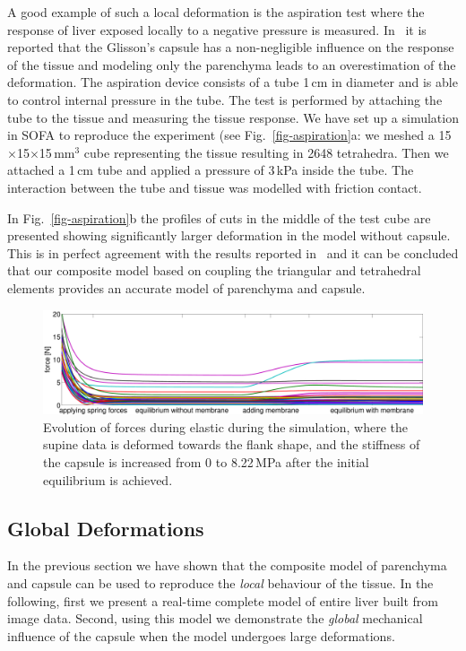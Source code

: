 \documentclass{llncs}
\begin{document}
A good example of such a local deformation is the aspiration test
where the response of liver exposed locally to a negative pressure is measured.
In~\cite{Hollenstein2006} it is reported that the Glisson's
capsule has a non-negligible influence on the response of the tissue and modeling
only the parenchyma leads to an overestimation of the deformation. 
The aspiration device consists of a tube 1\,cm in diameter and is able
to control internal pressure in the tube. The test is performed by
attaching the tube to the tissue and measuring the tissue response. We
have set up a simulation in SOFA to reproduce the experiment (see Fig.~\ref{fig-aspiration}a: we meshed a 15$\times$15$\times$15\,mm$^3$ 
cube representing the tissue 
resulting in 2648 tetrahedra. Then we attached a 1\,cm tube 
and applied a pressure of 3\,kPa inside the tube. The interaction between the tube and 
tissue was modelled with friction contact. 

In Fig.~\ref{fig-aspiration}b the profiles of cuts in the middle of the
test cube are presented showing significantly larger deformation in the model without capsule. This is in perfect 
agreement with the results reported in~\cite{Hollenstein2006} and it can be concluded that 
our composite model based on coupling the triangular and tetrahedral elements provides an accurate 
model of parenchyma and capsule.


\begin{figure}[t]
  \centering
    \includegraphics[width=.95\textwidth]{forceEvolution.pdf}
  \caption{\label{f:forceEvol}Evolution of forces during elastic during the simulation, where the supine data is deformed
towards the flank shape, and the stiffness of the capsule is increased from 0 to 8.22\,MPa after the initial equilibrium is achieved.}
\end{figure}

\subsection{Global Deformations}
In the previous section we have shown that the composite model of parenchyma and 
capsule can be used to reproduce the \emph{local} behaviour of the tissue. In the following, 
first we present a real-time complete model of entire liver built from image data. 
Second, using this model we demonstrate the \emph{global} mechanical influence of the capsule when 
the model undergoes large deformations. 
\end{document}
